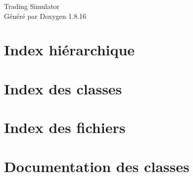 \let\mypdfximage\pdfximage\def\pdfximage{\immediate\mypdfximage}\documentclass[twoside]{book}
\newcommand{\+}{\discretionary{\mbox{\scriptsize$\hookleftarrow$}}{}{}}
\newcommand{\clearemptydoublepage}{%
  \newpage{\pagestyle{empty}\cleardoublepage}%
}
\begin{document}
\hypersetup{pageanchor=false,
             bookmarksnumbered=true,
             pdfencoding=unicode
            }
\begin{titlepage}
\vspace*{7cm}
\begin{center}%
{\Large Trading Simulator }\\
\vspace*{1cm}
{\large Généré par Doxygen 1.8.16}\\
\end{center}
\end{titlepage}
\clearemptydoublepage
{}
\tableofcontents
\clearemptydoublepage
{}
\hypersetup{pageanchor=true}

\chapter{Index hiérarchique}

\chapter{Index des classes}

\chapter{Index des fichiers}

\chapter{Documentation des classes}








































\end{document}
